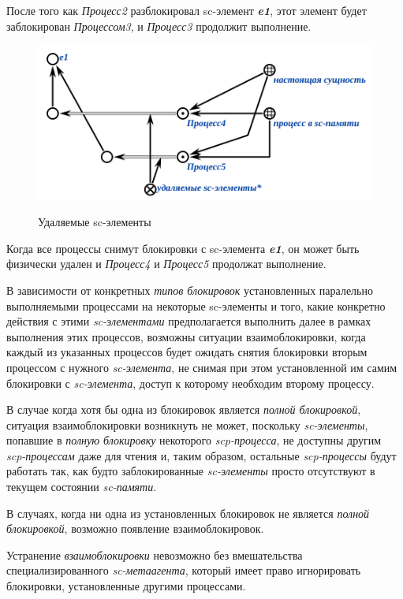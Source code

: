После того как \textit{Процесс2} разблокировал sc-элемент \textit{\textbf{e1}}, этот элемент будет заблокирован \textit{Процессом3}, и \textit{Процесс3} продолжит выполнение.

\begin{figure}[h]
	\centering
	\caption{Удаляемые sc-элементы}
	\includegraphics[scale=0.8]{images/part3/chapter_situation_management/plan_lock_4.png}
	\label{fig:plan_lock_4}
\end{figure}

Когда все процессы снимут блокировки с sc-элемента \textit{\textbf{e1}}, он может быть физически удален и \textit{Процесс4} и \textit{Процесс5} продолжат выполнение.

В зависимости от конкретных \textit{типов блокировок} установленных паралельно выполняемыми процессами на некоторые sc-элементы и того, какие конкретно действия с этими \textit{sc-элементами} предполагается выполнить далее в рамках выполнения этих процессов, возможны ситуации взаимоблокировки, когда каждый из указанных процессов будет ожидать снятия блокировки вторым процессом с нужного \textit{sc-элемента}, не снимая при этом установленной им самим блокировки с \textit{sc-элемента}, доступ к которому необходим второму процессу.
	
В случае когда хотя бы одна из блокировок является \textit{полной блокировкой}, ситуация взаимоблокировки возникнуть не может, поскольку \textit{sc-элементы}, попавшие в \textit{полную блокировку} некоторого \textit{scp-процесса}, не доступны другим \textit{scp-процессам} даже для чтения и, таким образом, остальные \textit{scp-процессы} будут работать так, как будто заблокированные \textit{sc-элементы} просто отсутствуют в текущем состоянии \textit{sc-памяти}.

В случаях, когда ни одна из установленных блокировок не является \textit{полной блокировкой}, возможно появление взаимоблокировок.

Устранение \textit{взаимоблокировки} невозможно без вмешательства специализированного \textit{sc-метаагента}, который имеет право игнорировать блокировки, установленные другими процессами. 
	
